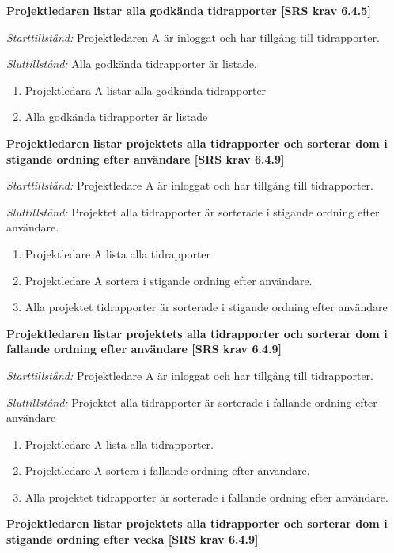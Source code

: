 \documentclass[a4paper]{article}
\begin{document}
\begin{FT}
\item %
\textbf{Projektledaren listar alla godkända tidrapporter [SRS krav 6.4.5]}

\emph{Starttillstånd:} Projektledaren A är inloggat och har tillgång till tidrapporter.

\emph{Sluttillstånd:} Alla godkända tidrapporter är listade.

\begin{enumerate}
\item Projektledara A listar alla godkända tidrapporter
\item Alla godkända tidrapporter är listade
\end{enumerate}

\item %
\textbf{Projektledaren listar projektets alla tidrapporter och sorterar dom i stigande ordning efter användare [SRS krav 6.4.9]}

\emph{Starttillstånd:} Projektledare A är inloggat och har tillgång till tidrapporter.

\emph{Sluttillstånd:} Projektet alla tidrapporter är sorterade i stigande ordning efter användare.

\begin{enumerate}
\item Projektledare A lista alla tidrapporter
\item Projektledare A sortera i stigande ordning efter användare.
\item Alla projektet tidrapporter är sorterade i stigande ordning efter användare
\end{enumerate}

\item %
\textbf{Projektledaren listar projektets alla tidrapporter och sorterar dom i fallande ordning efter användare [SRS krav 6.4.9]}

\emph{Starttillstånd:} Projektledare A är inloggat och har tillgång till tidrapporter.

\emph{Sluttillstånd:} Projektet alla tidrapporter är sorterade i fallande ordning efter användare

\begin{enumerate}
\item Projektledare A lista alla tidrapporter.
\item Projektledare A sortera i fallande ordning efter användare.
\item Alla projektet tidrapporter är sorterade i fallande ordning efter användare.
\end{enumerate}
\item %
\textbf{Projektledaren listar projektets alla tidrapporter och sorterar dom i stigande ordning efter vecka [SRS krav 6.4.9]}


\end{FT}
\end{document}

